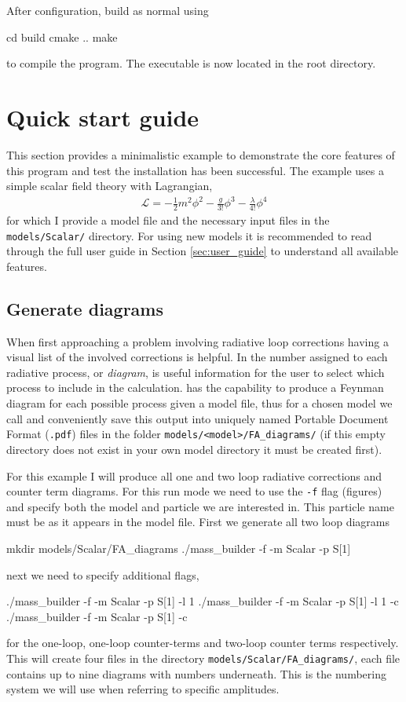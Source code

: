 After configuration, build as normal using
\begin{lstterm}
cd build
cmake ..
make
\end{lstterm}
to compile the program.  The \mb executable is now located in the root directory.

\section{Quick start guide}

This section provides a minimalistic example to demonstrate the core features of this program and test the installation has been successful.  The example uses a simple scalar field theory with Lagrangian,
\begin{align}
\mathcal{L} = -\frac{1}{2}m^2\phi^2 - \frac{g}{3!}\phi^3-\frac{\lambda}{4!}\phi^4
\end{align}
for which I provide a \feynarts model file and the necessary \mb input files in the \lstinline{models/Scalar/} directory.  For using new models it is recommended to read through the full user guide in Section \ref{sec:user_guide} to understand all available features.

\subsection{Generate \feynarts diagrams}\label{generate_diagrams}

When first approaching a problem involving radiative loop corrections having a visual list of the involved corrections is helpful.  In \mb the number assigned to each radiative process, or \textit{diagram}, is useful information for the user to select which process to include in the calculation.  \feynarts has the capability to produce a Feynman diagram for each possible process given a model file, thus for a chosen model we call \feynarts and conveniently save this output into uniquely named Portable Document Format (\lstinline{.pdf}) files in the folder \lstinline{models/<model>/FA_diagrams/} (if this empty directory does not exist in your own model directory it must be created first).

For this example I will produce all one and two loop radiative corrections and counter term diagrams.  For this run mode we need to use the \lstinline{-f} flag (figures) and specify both the model and particle we are interested in.  This particle name must be as it appears in the \feynarts model file.  First we generate all two loop diagrams
\begin{lstterm}
mkdir models/Scalar/FA_diagrams
./mass_builder -f -m Scalar -p S[1]
\end{lstterm}
next we need to specify additional flags,
\begin{lstterm}
./mass_builder -f -m Scalar -p S[1] -l 1
./mass_builder -f -m Scalar -p S[1] -l 1 -c
./mass_builder -f -m Scalar -p S[1] -c
\end{lstterm}
for the one-loop, one-loop counter-terms and two-loop counter terms respectively.  This will create four files in the directory \lstinline{models/Scalar/FA_diagrams/}, each file contains up to nine diagrams with numbers underneath.  This is the numbering system we will use when referring to specific amplitudes.

